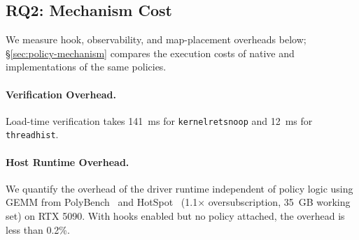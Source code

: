 \subsection{RQ2: Mechanism Cost}
\label{sec:rq2-cost}

We measure hook, observability, and map-placement overheads below; \S\ref{sec:policy-mechanism} compares the execution costs of native and \sys{} implementations of the same policies.

\paragraph{Verification Overhead.}
Load-time verification takes 141~ms for \texttt{kernelretsnoop} and 12~ms for \texttt{threadhist}.

\paragraph{Host Runtime Overhead.}
We quantify the overhead of the \sys driver runtime independent of policy logic using GEMM from PolyBench~\cite{grauer2012auto} and HotSpot~\cite{che2009rodinia} (1.1$\times$ oversubscription, 35~GB working set) on RTX 5090.
With hooks enabled but no policy attached, the overhead is less than 0.2\%.

